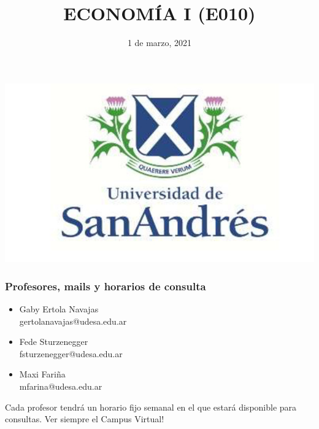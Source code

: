 \documentclass[14pt]{beamer}
\title{ECONOM\'{I}A I (E010)}
\date{1 de marzo, 2021}
\begin{document}
\begin{frame}
\titlepage
\centering
\includegraphics[scale=0.25]{Figures/logoUDESA.jpg} 
\end{frame}

\begin{frame}
\frametitle{Profesores, mails y horarios de consulta}
\begin{itemize}
    \item Gaby Ertola Navajas
    \vspace{1mm} \\gertolanavajas@udesa.edu.ar
    \vspace{2mm} \\
    \item Fede Sturzenegger
    \vspace{1mm} \\fsturzenegger@udesa.edu.ar
    \vspace{2mm} \\
    \item Maxi Fariña
    \vspace{1mm} \\mfarina@udesa.edu.ar
    \vspace{2mm} \\
\end{itemize}
Cada profesor tendrá un horario fijo semanal en el que estará disponible para consultas. Ver siempre el Campus Virtual!
\end{frame}
\end{document}
